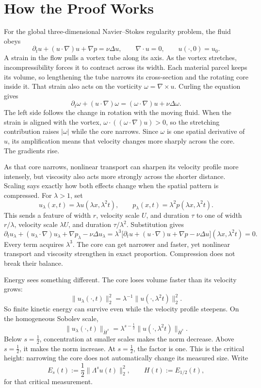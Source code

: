 \documentclass[11pt]{article}
\begin{document}
\section*{How the Proof Works}

For the global three-dimensional Navier--Stokes regularity problem, the fluid obeys
\[
\partial_tu+(u\cdot\nabla)u+\nabla p=\nu\Delta u,
\qquad \nabla\cdot u=0,
\qquad u(\cdot,0)=u_0.
\]
A strain in the flow pulls a vortex tube along its axis. As the vortex stretches, incompressibility forces it to contract across its width. Each material parcel keeps its volume, so lengthening the tube narrows its cross-section and the rotating core inside it. That strain also acts on the vorticity \(\omega=\nabla\times u\). Curling the equation gives
\[
\partial_t\omega+(u\cdot\nabla)\omega
=(\omega\cdot\nabla)u+\nu\Delta\omega.
\]
The left side follows the change in rotation with the moving fluid. When the strain is aligned with the vortex, \(\omega\cdot((\omega\cdot\nabla)u)>0\), so the stretching contribution raises \(|\omega|\) while the core narrows. Since \(\omega\) is one spatial derivative of \(u\), its amplification means that velocity changes more sharply across the core. The gradients rise.

As that core narrows, nonlinear transport can sharpen its velocity profile more intensely, but viscosity also acts more strongly across the shorter distance. Scaling says exactly how both effects change when the spatial pattern is compressed. For \(\lambda>1\), set
\[
u_\lambda(x,t)=\lambda u(\lambda x,\lambda^2t),
\qquad
p_\lambda(x,t)=\lambda^2p(\lambda x,\lambda^2t).
\]
This sends a feature of width \(r\), velocity scale \(U\), and duration \(\tau\) to one of width \(r/\lambda\), velocity scale \(\lambda U\), and duration \(\tau/\lambda^2\). Substitution gives
\[
\partial_tu_\lambda+(u_\lambda\cdot\nabla)u_\lambda
+\nabla p_\lambda-\nu\Delta u_\lambda
=\lambda^3
\bigl[\partial_tu+(u\cdot\nabla)u+\nabla p-\nu\Delta u\bigr]
(\lambda x,\lambda^2t)=0.
\]
Every term acquires \(\lambda^3\). The core can get narrower and faster, yet nonlinear transport and viscosity strengthen in exact proportion. Compression does not break their balance.

Energy sees something different. The core loses volume faster than its velocity grows:
\[
\|u_\lambda(\cdot,t)\|_2^2
=\lambda^{-1}\|u(\cdot,\lambda^2t)\|_2^2.
\]
So finite kinetic energy can survive even while the velocity profile steepens. On the homogeneous Sobolev scale,
\[
\|u_\lambda(\cdot,t)\|_{\dot H^s}
=\lambda^{s-\frac12}
\|u(\cdot,\lambda^2t)\|_{\dot H^s}.
\]
Below \(s=\tfrac12\), concentration at smaller scales makes the norm decrease. Above \(s=\tfrac12\), it makes the norm increase. At \(s=\tfrac12\), the factor is one. This is the critical height: narrowing the core does not automatically change its measured size. Write
\[
E_s(t):=\frac12\|\Lambda^su(t)\|_2^2,
\qquad
H(t):=E_{1/2}(t),
\]
for that critical measurement.
\end{document}
